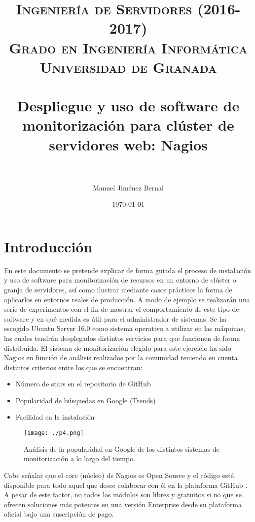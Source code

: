 \documentclass[paper=a4, fontsize=12pt]{scrartcl} %
\title{	
\normalfont \normalsize 
\textsc{{ Ingeniería de Servidores (2016-2017)} \\ Grado en Ingeniería Informática \\ Universidad de Granada} \\ [25pt] %
\horrule{0.5pt} \\[0.4cm] %
\huge Despliegue y uso de software de monitorización para clúster de servidores web: Nagios \\ %
\horrule{2pt} \\[0.5cm] %
}
\author{Manuel Jim\'enez Bernal} %
\date{\normalsize\today} %
\begin{document}
\maketitle %
\newpage
\tableofcontents %

\listoffigures
\newpage


\section{Introducción}
En este documento se pretende explicar de forma guiada el proceso de instalación y uso de software para monitorización de recursos en un entorno de clúster o granja de servidores, así como ilustrar mediante casos prácticos la forma de aplicarlos  en entornos reales de producción. A modo de ejemplo se realizarán una serie de experimentos con el fin de mostrar el comportamiento de este tipo de software y en qué medida es útil para el administrador de sistemas. Se ha escogido Ubuntu Server 16.0 como sistema operativo a utilizar en las máquinas, las cuales tendrán desplegados distintos servicios para que funcionen de forma distribuida.
El sistema de monitorización elegido para este ejercicio ha sido Nagios en función de análisis realizados por la comunidad teniendo en cuenta distintos criterios entre los que se encuentran:

\begin{itemize}
	\item Número de stars en el repositorio de GitHub \cite{p4}
	\item Popularidad de búsquedas en Google (Trends) \cite{p5}
	\item Facilidad en la instalación
\end{itemize}

\begin{figure}[H] %
	\centering
	\label{lsblk}
	\texttt{[image: ./p4.png]}
	\caption{Análisis de la popularidad en Google de los distintos sistemas de monitorización a lo largo del tiempo.} 
\end{figure}

Cabe señalar que el core (núcleo) de Nagios es Open Source y el código está disponible para todo aquel que desee colaborar con él en la plataforma GitHub \cite{p4}. A pesar de este factor, no todos los módulos son libres y gratuitos si no que se ofrecen soluciones más potentes en una versión Enterprise desde su plataforma oficial bajo una suscripción de pago. 
	
\end{document}
